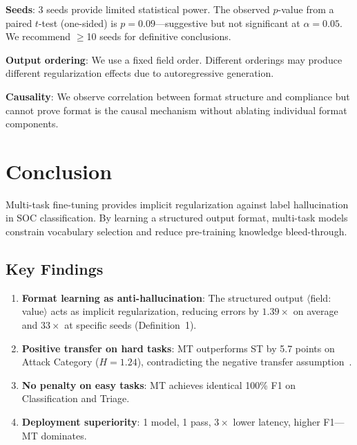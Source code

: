 \documentclass[review,3p]{elsarticle}
\begin{document}
\textbf{Seeds}: 3 seeds provide limited statistical power. The observed $p$-value from a paired $t$-test (one-sided) is $p = 0.09$---suggestive but not significant at $\alpha = 0.05$. We recommend $\geq$10 seeds for definitive conclusions.

\textbf{Output ordering}: We use a fixed field order. Different orderings may produce different regularization effects due to autoregressive generation.

\textbf{Causality}: We observe correlation between format structure and compliance but cannot prove format is the causal mechanism without ablating individual format components.

\section{Conclusion}

Multi-task fine-tuning provides implicit regularization against label hallucination in SOC classification. By learning a structured output format, multi-task models constrain vocabulary selection and reduce pre-training knowledge bleed-through.

\subsection{Key Findings}
\begin{enumerate}
\item \textbf{Format learning as anti-hallucination}: The structured output $\langle$field: value$\rangle$ acts as implicit regularization, reducing errors by $1.39\times$ on average and $33\times$ at specific seeds (Definition~1).
\item \textbf{Positive transfer on hard tasks}: MT outperforms ST by 5.7 points on Attack Category ($H=1.24$), contradicting the negative transfer assumption~\cite{standley2020}.
\item \textbf{No penalty on easy tasks}: MT achieves identical 100\% F1 on Classification and Triage.
\item \textbf{Deployment superiority}: 1 model, 1 pass, $3\times$ lower latency, higher F1---MT dominates.
\end{enumerate}
\end{document}
